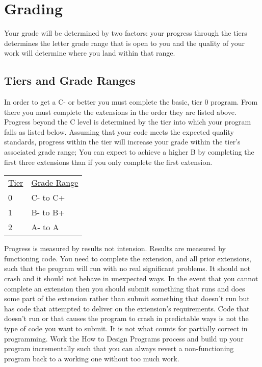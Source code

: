 \documentclass[nobib]{tufte-handout}
\begin{document}
  \section*{Grading}

  Your grade will be determined by two factors: your progress through the tiers determines the letter grade range that is open to you and the quality of your work will determine where you land within that range.

  \subsection*{Tiers and Grade Ranges}

  In order to get a C- or better you must complete the basic, tier 0 program. From there you must complete the extensions in the order they are listed above. Progress beyond the C level is determined by the tier into which your program falls as listed below. Assuming that your code meets the expected quality standards, progress within the tier will increase your grade within the tier's associated grade range; You can expect to achieve a higher B by completing the first three extensions than if you only complete the first extension.

  \begin{tabular}{ll}
    \underline{Tier} & \underline{Grade Range} \\
     0 & C- to C+ \\
     1 & B- to B+ \\
     2 & A- to A
  \end{tabular}

  Progress is measured by results not intension. Results are measured by functioning code. You need to complete the extension, and all prior extensions, such that the program will run with no real significant problems. It should not crash and it should not behave in unexpected ways. In the event that you cannot complete an extension then you should submit something that runs and does some part of the extension rather than submit something that doesn't run but has code that attempted to deliver on the extension's requirements. Code that doesn't run or that causes the program to crash in predictable ways is not the type of code you want to submit. It is not what counts for partially correct in programming. Work the How to Design Programs process and build up your program incrementally such that you can always revert a non-functioning program back to a working one without too much work.
\end{document}
